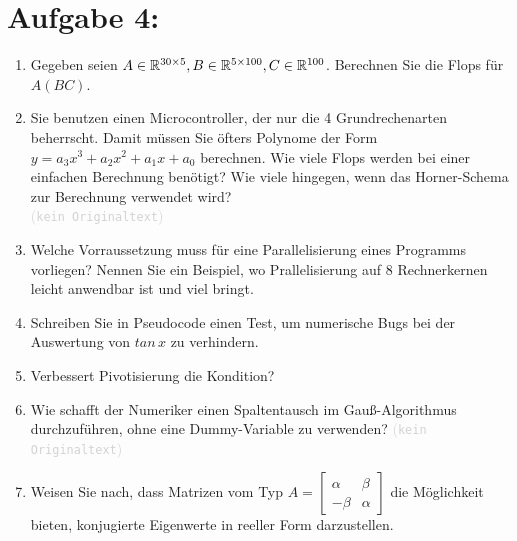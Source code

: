 \documentclass[12pt]{article}
\newcommand{\kommentarMacro}[1]{\textcolor{lightgray}{(\texttt{#1})}}
\begin{document}
\section*{Aufgabe 4:}
\begin{enumerate}
	\item Gegeben seien $A\in \mathbb{R}^{30\times 5}, B\in \mathbb{R}^{5\times 100}, C\in \mathbb{R}^{100}$. Berechnen Sie die Flops für $A(BC)$.

	      \vspace{1.25cm}

	\item Sie benutzen einen Microcontroller, der nur die 4 Grundrechenarten beherrscht. Damit müssen Sie öfters Polynome der Form $y=a_3x^3+a_2x^2+a_1x+a_0$ berechnen. Wie viele Flops werden bei einer einfachen Berechnung benötigt? Wie viele hingegen, wenn das Horner-Schema zur Berechnung verwendet wird? \\ \kommentarMacro{kein Originaltext}

	      \vspace{1.5cm}

	\item Welche Vorraussetzung muss für eine Parallelisierung eines Programms vorliegen? Nennen Sie ein Beispiel, wo Prallelisierung auf 8 Rechnerkernen leicht anwendbar ist und viel bringt.

	      \vspace{1.5cm}

	\item Schreiben Sie in Pseudocode einen Test, um numerische Bugs bei der Auswertung von $tan\,x$ zu verhindern.

	      \vspace{1.5cm}

	\item Verbessert Pivotisierung die Kondition?

	      \vspace{1.25cm}

	\item Wie schafft der Numeriker einen Spaltentausch im Gauß-Algorithmus durchzuführen, ohne eine Dummy-Variable zu verwenden? \kommentarMacro{kein Originaltext}

	      \vspace{1.25cm}

	\item Weisen Sie nach, dass Matrizen vom Typ $A = \begin{bmatrix} \alpha & \beta \\ -\beta & \alpha \end{bmatrix}$ die  Möglichkeit bieten, konjugierte Eigenwerte in reeller Form darzustellen.

\end{enumerate}
\pagebreak
\end{document}
